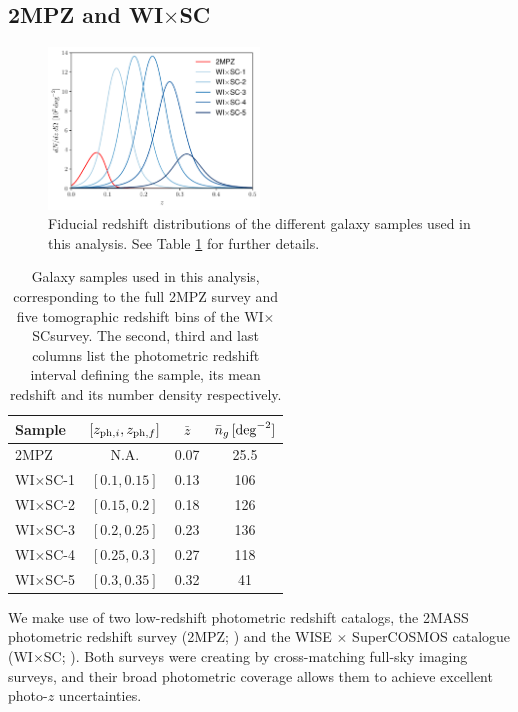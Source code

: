 \documentclass[useAMS,usenatbib]{mn2e}
\newcommand{\wisc}{WI$\times$SC}
\begin{document}
  \subsection{2MPZ and \wisc}\label{ssec:data.g1}
    \begin{figure}
      \centering
      \includegraphics[width=0.5\textwidth]{./figures/nzs.pdf}
      \caption{Fiducial redshift distributions of the different galaxy samples used in this analysis. See Table \ref{tab:z_bins} for further details.}
      \label{fig:dndz}
    \end{figure}
    \begin{table}
      \begin{center}
        \begin{tabular}{l|ccc}
          \hline
          Sample & $[z_{{\rm ph},i},z_{{\rm ph},f}]$ & $\bar{z}$ & $\bar{n}_g\,[{\rm deg}^{-2}]$\\
          \hline
          2MPZ    & N.A.         & 0.07 &  25.5 \\
          \wisc-1 & $[0.1,0.15]$ & 0.13 & 106   \\
          \wisc-2 & $[0.15,0.2]$ & 0.18 & 126   \\
          \wisc-3 & $[0.2,0.25]$ & 0.23 & 136   \\
          \wisc-4 & $[0.25,0.3]$ & 0.27 & 118   \\
          \wisc-5 & $[0.3,0.35]$ & 0.32 & 41    \\
          \hline
        \end{tabular}
        \caption{Galaxy samples used in this analysis, corresponding to the full 2MPZ survey and five tomographic redshift bins of the \wisc survey. The second, third and last columns list the photometric redshift interval defining the sample, its mean redshift and its number density respectively.}\label{tab:z_bins}
      \end{center}
    \end{table} 
    We make use of two low-redshift photometric redshift catalogs, the 2MASS photometric redshift survey (2MPZ; \cite{2014ApJS..210....9B}) and the WISE $\times$ SuperCOSMOS catalogue (\wisc; \cite{2016ApJS..225....5B}). Both surveys were creating by cross-matching full-sky imaging surveys, and their broad photometric coverage allows them to achieve excellent photo-$z$ uncertainties.
    
\end{document}
